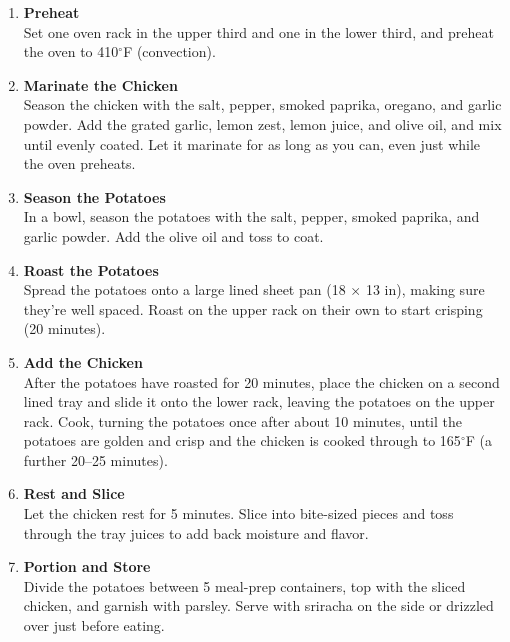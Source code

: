 \begin{enumerate}

      \item \textbf{Preheat} \\
            Set one oven rack in the upper third and one in the lower third, and preheat the oven to 410$^\circ$F (convection).

      \item \textbf{Marinate the Chicken} \\
            Season the chicken with the salt, pepper, smoked paprika, oregano, and garlic powder. Add the grated garlic, lemon zest, lemon juice, and olive oil, and mix until evenly coated. Let it marinate for as long as you can, even just while the oven preheats.

      \item \textbf{Season the Potatoes} \\
            In a bowl, season the potatoes with the salt, pepper, smoked paprika, and garlic powder. Add the olive oil and toss to coat.

      \item \textbf{Roast the Potatoes} \\
            Spread the potatoes onto a large lined sheet pan (18 $\times$ 13 in), making sure they're well spaced. Roast on the upper rack on their own to start crisping (20 minutes).

      \item \textbf{Add the Chicken} \\
            After the potatoes have roasted for 20 minutes, place the chicken on a second lined tray and slide it onto the lower rack, leaving the potatoes on the upper rack. Cook, turning the potatoes once after about 10 minutes, until the potatoes are golden and crisp and the chicken is cooked through to 165$^\circ$F (a further 20--25 minutes).

      \item \textbf{Rest and Slice} \\
            Let the chicken rest for 5 minutes. Slice into bite-sized pieces and toss through the tray juices to add back moisture and flavor.

      \item \textbf{Portion and Store} \\
            Divide the potatoes between 5 meal-prep containers, top with the sliced chicken, and garnish with parsley. Serve with sriracha on the side or drizzled over just before eating.

\end{enumerate}




